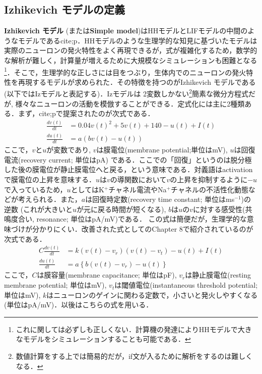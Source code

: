 \subsection{Izhikevich モデルの定義}
\textbf{Izhikevich モデル} (または\textbf{Simple model})はHHモデルとLIFモデルの中間のようなモデルである{cite;p}．HHモデルのような生理学的な知見に基づいたモデルは実際のニューロンの発火特性をよく再現できるが，式が複雑化するため，数学的な解析が難しく，計算量が増えるために大規模なシミュレーションも困難となる\footnote{これに関しては必ずしも正しくない．計算機の発達によりHHモデルで大きなモデルをシミュレーションすることも可能である．}．そこで，生理学的な正しさには目をつぶり，生体内でのニューロンの発火特性を再現するモデルが求められた．その特徴を持つのがIzhikevich モデルである (以下ではIzモデルと表記する)．Izモデルは 2変数しかない\footnote{数値計算をする上では簡易的だが，if文が入るために解析をするのは難しくなる．}簡素な微分方程式だが, 様々なニューロンの活動を模倣することができる\citep{Izhikevich2004-xf}．定式化には主に2種類ある．まず，{cite;p}で提案されたのが次式である．
\begin{align}
\frac{dv(t)}{dt}&=0.04v(t)^2 + 5v(t)+140-u(t)+I(t) \\
\frac{du(t)}{dt}&=a(bv(t)-u(t))
\end{align} 
ここで，$v$と$u$が変数であり, $v$は膜電位(membrane potential;単位はmV), $u$は回復電流(recovery current; 単位はpA) である．ここでの「回復」というのは脱分極した後の膜電位が静止膜電位へと戻る，という意味である．対義語はactivationで膜電位の上昇を意味する．$u$は$v$の導関数において$v$の上昇を抑制するように$-u$で入っているため，$u$としてはK$^+$チャネル電流やNa$^+$チャネルの不活性化動態などが考えられる．また，$a$は回復時定数(recovery time constant; 単位はms$^{-1}$)の逆数 (これが大きいと$u$が元に戻る時間が短くなる), $b$は$u$の$v$に対する感受性(共鳴度合い,  resonance; 単位はpA/mV)である．
この式は簡便だが，生理学的な意味づけが分かりにくい．改善された式として\citep{Izhikevich2007-ff}のChapter 8で紹介されているのが次式である．
\begin{align}
C\frac{dv(t)}{dt}&=k\left(v(t)-v_r\right)\left(v(t)-v_t\right)-u(t)+I(t) \\
\frac{du(t)}{dt}&=a\left\{b\left(v(t)-v_{r}\right)-u(t)\right\}
\end{align} 
ここで，$C$は膜容量(membrane capacitance; 単位はpF), $v_r$は静止膜電位(resting membrane potential; 単位はmV), $v_t$は閾値電位(instantaneous threshold potential; 単位はmV), $k$はニューロンのゲインに関わる定数で，小さいと発火しやすくなる (単位はpA/mV)．以後はこちらの式を用いる．
